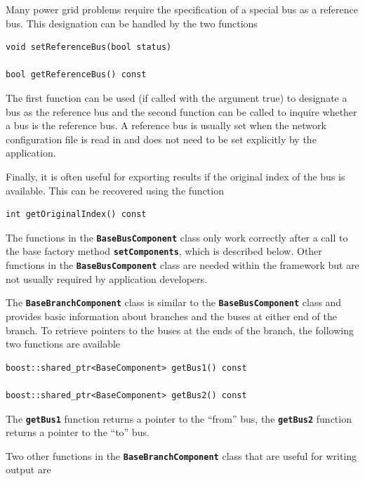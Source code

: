 \documentclass[12pt]{report} %
\begin{document}
Many power grid problems require the specification of a special bus as a reference bus. This designation can be handled by the two functions

{
\color{red}
\begin{Verbatim}[fontseries=b]
void setReferenceBus(bool status)

bool getReferenceBus() const
\end{Verbatim}
}

The first function can be used (if called with the argument true) to designate a bus as the reference bus and the second function can be called to inquire whether a bus is the reference bus. A reference bus is usually set when the network configuration file is read in and does not need to be set explicitly by the application.

Finally, it is often useful for exporting results if the original index of the bus is available. This can be recovered using the function

{
\color{red}
\begin{Verbatim}[fontseries=b]
int getOriginalIndex() const
\end{Verbatim}
}

The functions in the \texttt{\textbf{BaseBusComponent}} class only work correctly after a call to the base factory method \texttt{\textbf{setComponents}}, which is described below. Other functions in the \texttt{\textbf{BaseBusComponent}} class are needed within the framework but are not usually required by application developers.

The \texttt{\textbf{BaseBranchComponent}} class is similar to the \texttt{\textbf{BaseBusComponent}} class and provides basic information about branches and the buses at either end of the branch. To retrieve pointers to the buses at the ends of the branch, the following two functions are available

{
\color{red}
\begin{Verbatim}[fontseries=b]
boost::shared_ptr<BaseComponent> getBus1() const

boost::shared_ptr<BaseComponent> getBus2() const
\end{Verbatim}
}

The \texttt{\textbf{getBus1}} function returns a pointer to the ``from'' bus, the \texttt{\textbf{getBus2}} function returns a pointer to the ``to'' bus.

Two other functions in the \texttt{\textbf{BaseBranchComponent}} class that are useful for writing output are
\end{document}
